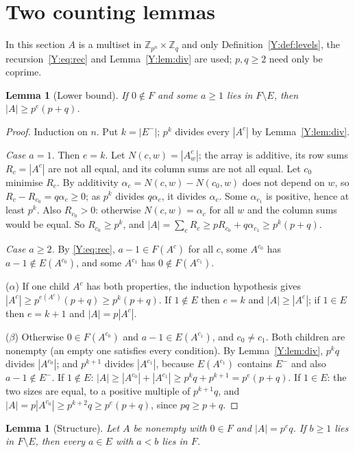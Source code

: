 \documentclass[11pt,a4paper]{amsart}
\newtheorem{lemma}[theorem]{Lemma}
\theoremstyle{definition}
\theoremstyle{remark}
\newcommand{\Z}{\mathbb{Z}}
\begin{document}
\section{Two counting lemmas}\label{Y:sec:count}

In this section $A$ is a multiset in $\Z_{p^n}\times\Z_q$ and only Definition~\ref{Y:def:levels}, the
recursion~\eqref{Y:eq:rec} and Lemma~\ref{Y:lem:div} are used; $p,q\ge2$ need only be coprime.

\begin{lemma}[Lower bound]\label{Y:lem:three}
If $0\notin F$ and some $a\ge1$ lies in $F\setminus E$, then $|A|\ge p^{e}(p+q)$.
\end{lemma}

\begin{proof}
Induction on $n$. Put $k=|E^-|$; $p^k$ divides every $|A^c|$ by Lemma~\ref{Y:lem:div}.

\emph{Case $a=1$.} Then $e=k$. Let $N(c,w)=|A^c_w|$; the array is additive, its row sums $R_c=|A^c|$ are not
all equal, and its column sums are not all equal. Let $c_0$ minimise $R_c$. By additivity
$\alpha_c=N(c,w)-N(c_0,w)$ does not depend on $w$, so $R_c-R_{c_0}=q\alpha_c\ge0$; as $p^k$ divides
$q\alpha_c$, it divides $\alpha_c$. Some $\alpha_{c_1}$ is positive, hence at least $p^k$. Also $R_{c_0}>0$:
otherwise $N(c,w)=\alpha_c$ for all $w$ and the column sums would be equal. So $R_{c_0}\ge p^k$, and
$|A|=\sum_cR_c\ge pR_{c_0}+q\alpha_{c_1}\ge p^k(p+q)$.

\emph{Case $a\ge2$.} By \eqref{Y:eq:rec}, $a-1\in F(A^c)$ for all $c$, some $A^{c_0}$ has $a-1\notin E(A^{c_0})$,
and some $A^{c_1}$ has $0\notin F(A^{c_1})$.

($\alpha$) If one child $A^c$ has both properties, the induction hypothesis gives
$|A^c|\ge p^{e(A^c)}(p+q)\ge p^k(p+q)$. If $1\notin E$ then $e=k$ and $|A|\ge|A^c|$; if $1\in E$ then $e=k+1$
and $|A|=p|A^c|$.

($\beta$) Otherwise $0\in F(A^{c_0})$ and $a-1\in E(A^{c_1})$, and $c_0\ne c_1$. Both children are nonempty
(an empty one satisfies every condition). By Lemma~\ref{Y:lem:div}, $p^kq$ divides $|A^{c_0}|$; and
$p^{k+1}$ divides $|A^{c_1}|$, because $E(A^{c_1})$ contains $E^-$ and also $a-1\notin E^-$. If $1\notin E$:
$|A|\ge|A^{c_0}|+|A^{c_1}|\ge p^kq+p^{k+1}=p^e(p+q)$. If $1\in E$: the two sizes are equal, to a positive
multiple of $p^{k+1}q$, and $|A|=p|A^{c_0}|\ge p^{k+2}q\ge p^{e}(p+q)$, since $pq\ge p+q$.
\end{proof}

\begin{lemma}[Structure]\label{Y:lem:four}
Let $A$ be nonempty with $0\in F$ and $|A|=p^{e}q$. If $b\ge1$ lies in $F\setminus E$, then every $a\in E$
with $a<b$ lies in $F$.
\end{lemma}
\end{document}

